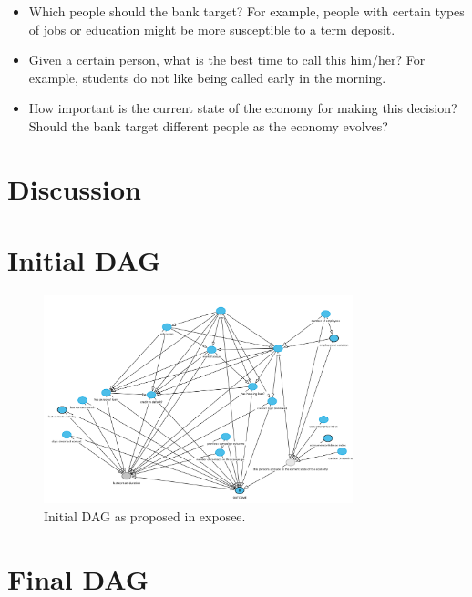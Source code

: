 \documentclass[11pt,]{article}
\providecommand{\tightlist}{%
  \setlength{\itemsep}{0pt}\setlength{\parskip}{0pt}}
\begin{document}
\begin{multicols}{2}
\begin{itemize}
\tightlist
\item
  Which people should the bank target? For example, people with certain
  types of jobs or education might be more susceptible to a term
  deposit.
\item
  Given a certain person, what is the best time to call this him/her?
  For example, students do not like being called early in the morning.
\item
  How important is the current state of the economy for making this
  decision? Should the bank target different people as the economy
  evolves?
\end{itemize}

\hypertarget{discussion}{%
\section{Discussion}\label{discussion}}

\end{multicols}
\newpage
\appendix

\hypertarget{initial-dag}{%
\section{Initial DAG}\label{initial-dag}}

\label{sec:initial_dag}

\begin{figure}[h]
    \centering
    \includegraphics[width=0.8\textwidth]{images/initial_dag}
    \caption{Initial DAG as proposed in exposee.}
    \label{fig:initial_dag}
\end{figure}

\hypertarget{final-dag}{%
\section{Final DAG}\label{final-dag}}
\end{document}
